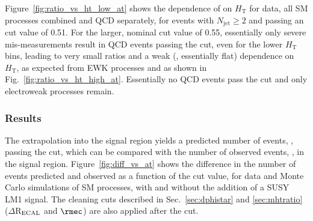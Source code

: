 Figure~\ref{fig:ratio_vs_ht_low_at} shows the dependence of \RaT on
$H_{\mathrm{T}}$ for data, all SM processes combined and QCD
separately, for events with $N_{\mathrm{jet}}\geq2$ and passing an \aT
cut value of 0.51. 
For the larger, nominal cut value of 0.55, essentially only severe
mis-measurements result in QCD events passing the \aT cut, even for
the lower $H_{\mathrm{T}}$ bins, leading to very small ratios and a
weak (\ie, essentially flat) dependence on $H_{\mathrm{T}}$, as
expected from EWK processes and as shown in
Fig.~\ref{fig:ratio_vs_ht_high_at}. Essentially no QCD events pass the
\aT cut and only electroweak processes remain.

\subsubsection{Results}

The extrapolation into the signal region yields a predicted number of
events, \Npre, passing the \aT cut, which can be compared with the
number of observed events, \Nobs, in the signal
region. Figure~\ref{fig:diff_vs_at} shows the difference in the number
of events predicted and observed as a function of the \aT cut value,
for data and Monte Carlo simulations of SM processes, with and without
the addition of a SUSY LM1 signal. The cleaning cuts described in
Sec.~\ref{sec:dphistar} and \ref{sec:mhtratio} ($\Delta$R$_{\rm ECAL}$
and $\rmec$) are also applied after the \aT cut.

